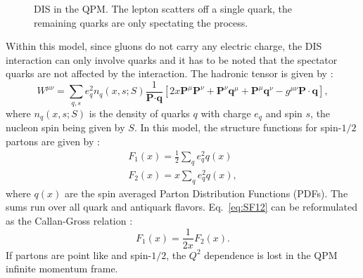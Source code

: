\begin{figure}[!h]
  \centering

	\caption{DIS in the QPM. The lepton scatters off a single quark, the remaining quarks are only spectating the process.}
	\label{pic:DISQPM}
\end{figure}

Within this model, since gluons do not carry any electric charge, the DIS interaction can only involve quarks and it has to be noted that the spectator quarks are not affected by the interaction. The hadronic tensor is given by \cite{AEL}:
%
\begin{equation}
  W^{\mu\nu} = \sum\limits_{q,s}e^2_qn_q(x,s;S)\frac{1}{\textbf{P}\cdot\textbf{q}}\left[2x\textbf{P}^{\mu}\textbf{P}^{\nu}
  +\textbf{P}^{\nu}\textbf{q}^{\mu}+\textbf{P}^{\mu}\textbf{q}^{\nu}-g^{\mu\nu}\textbf{P}\cdot\textbf{q}\right],
  \label{eq:HadronicTensor}
\end{equation}
%
where $n_q(x,s;S)$ is the density of quarks $q$ with charge $e_q$ and spin $s$, the nucleon spin being given by $S$. In this model, the structure functions for spin-$1/2$ partons are given by \cite{AEL}:
%
\begin{equation}\label{eq:SF12}
  \begin{split}
  F_1(x)=\frac{1}{2}\sum\limits_{q}e^2_qq(x) \\
  F_2(x)=x\sum\limits_{q}e^2_qq(x),
  \end{split}
\end{equation}
%
where $q(x)$ are the spin averaged Parton Distribution Functions (PDFs). The sums run over all quark and antiquark flavors. Eq.~\ref{eq:SF12} can be reformulated as the Callan-Gross relation \cite{CallanGross}:
%
\begin{equation*}
  F_1(x)=\frac{1}{2x}F_2(x).
\end{equation*}
%
If partons are point like and spin-$1/2$, the $Q^2$ dependence is lost in the QPM infinite momentum frame.

